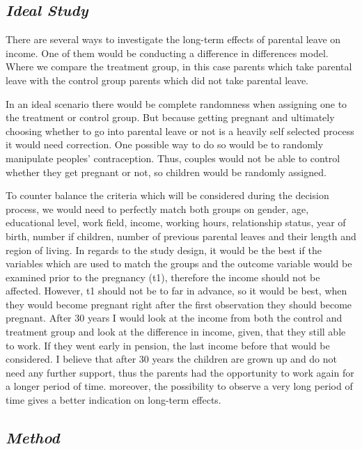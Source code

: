 \documentclass[
  12pt,
]{article}
\begin{document}
\hypertarget{ideal-study}{%
\subsection*{\texorpdfstring{\emph{Ideal Study}}{Ideal Study}}\label{ideal-study}}

There are several ways to investigate the long-term effects of parental leave on income. One of them would be conducting a difference in differences model. Where we compare the treatment group, in this case parents which take parental leave with the control group parents which did not take parental leave.

In an ideal scenario there would be complete randomness when assigning one to the treatment or control group. But because getting pregnant and ultimately choosing whether to go into parental leave or not is a heavily self selected process it would need correction. One possible way to do so would be to randomly manipulate peoples' contraception. Thus, couples would not be able to control whether they get pregnant or not, so children would be randomly assigned.

To counter balance the criteria which will be considered during the decision process, we would need to perfectly match both groups on gender, age, educational level, work field, income, working hours, relationship status, year of birth, number if children, number of previous parental leaves and their length and region of living.
In regards to the study design, it would be the best if the variables which are used to match the groups and the outcome variable would be examined prior to the pregnancy (t1), therefore the income should not be affected. However, t1 should not be to far in advance, so it would be best, when they would become pregnant right after the first observation they should become pregnant. After 30 years I would look at the income from both the control and treatment group and look at the difference in income, given, that they still able to work. If they went early in pension, the last income before that would be considered. I believe that after 30 years the children are grown up and do not need any further support, thus the parents had the opportunity to work again for a longer period of time. moreover, the possibility to observe a very long period of time gives a better indication on long-term effects.

\hypertarget{method}{%
\subsection*{\texorpdfstring{\emph{Method}}{Method}}\label{method}}
\end{document}

